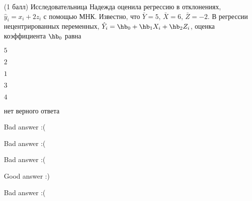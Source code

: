 
\begin{question}
(1 балл) Исследовательница Надежда оценила регрессию в отклонениях,
\(\hat y_i = x_i + 2 z_i\) с помощью МНК. Известно, что \(\bar Y=5\),
\(\bar X =6\), \(\bar Z=-2\). В регрессии нецентрированных переменных,
\(\hat Y_i = \hb_0 + \hb_1 X_i + \hb_2 Z_i\), оценка коэффициента
\(\hb_0\) равна
\begin{answerlist}
  \item \(5\)
  \item \(2\)
  \item \(1\)
  \item \(3\)
  \item \(4\)
  \item нет верного ответа
\end{answerlist}
\end{question}

\begin{solution}
\begin{answerlist}
  \item Bad answer :(
  \item Bad answer :(
  \item Bad answer :(
  \item Good answer :)
  \item Bad answer :(
\end{answerlist}
\end{solution}
